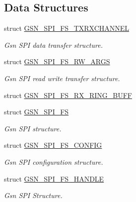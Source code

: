 \subsection*{Data Structures}
\begin{DoxyCompactItemize}
\item 
struct \hyperlink{a00237}{GSN\_\-SPI\_\-FS\_\-TXRXCHANNEL}
\begin{DoxyCompactList}\small\item\em Gsn SPI data transfer structure. \end{DoxyCompactList}\item 
struct \hyperlink{a00235}{GSN\_\-SPI\_\-FS\_\-RW\_\-ARGS}
\begin{DoxyCompactList}\small\item\em Gsn SPI read write transfer structure. \end{DoxyCompactList}\item 
struct \hyperlink{a00236}{GSN\_\-SPI\_\-FS\_\-RX\_\-RING\_\-BUFF}
\item 
struct \hyperlink{a00232}{GSN\_\-SPI\_\-FS}
\begin{DoxyCompactList}\small\item\em Gsn SPI structure. \end{DoxyCompactList}\item 
struct \hyperlink{a00233}{GSN\_\-SPI\_\-FS\_\-CONFIG}
\begin{DoxyCompactList}\small\item\em Gsn SPI configuration structure. \end{DoxyCompactList}\item 
struct \hyperlink{a00234}{GSN\_\-SPI\_\-FS\_\-HANDLE}
\begin{DoxyCompactList}\small\item\em Gsn SPI Structure. \end{DoxyCompactList}\end{DoxyCompactItemize}
